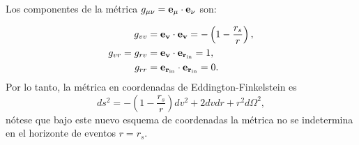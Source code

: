 Los componentes de la métrica \( g_{\mu\nu} = \mathbf{e_\mu} \cdot \mathbf{e_\nu} \) son:

\begin{equation}
    \begin{aligned}
        g_{vv}          & = \mathbf{e_v} \cdot \mathbf{e_v} = -\left(1 - \frac{r_s}{r}\right), \\
        g_{vr} = g_{rv} & = \mathbf{e_v} \cdot \mathbf{e_{r_{\text{in}}}} = 1,                 \\
        g_{rr}          & = \mathbf{e_{r_{\text{in}}}} \cdot \mathbf{e_{r_{\text{in}}}} = 0.
    \end{aligned}
\end{equation}
Por lo tanto, la métrica en coordenadas de Eddington-Finkelstein es 
\begin{equation}
    ds^2 = -\left(1 - \frac{r_s}{r}\right) dv^2 + 2 dv dr + r^2 d\Omega^2,
\end{equation}
nótese que bajo este nuevo esquema de coordenadas la métrica no se indetermina en el horizonte de eventos \( r = r_s \).  
